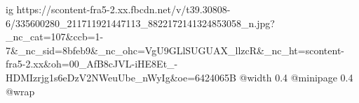  
 
 
 
 

\ifcmt
  ig https://scontent-fra5-2.xx.fbcdn.net/v/t39.30808-6/335600280_211711921447113_8822172141324853058_n.jpg?_nc_cat=107&ccb=1-7&_nc_sid=8bfeb9&_nc_ohc=VgU9GLlSUGUAX_llzcR&_nc_ht=scontent-fra5-2.xx&oh=00_AfB8cJVL-iHE8Et_-HDMIzrjg1s6eDzV2NWeuUbe_nWyIg&oe=6424065B
  @width 0.4
  @minipage 0.4
  @wrap \parpic[r]
\fi
